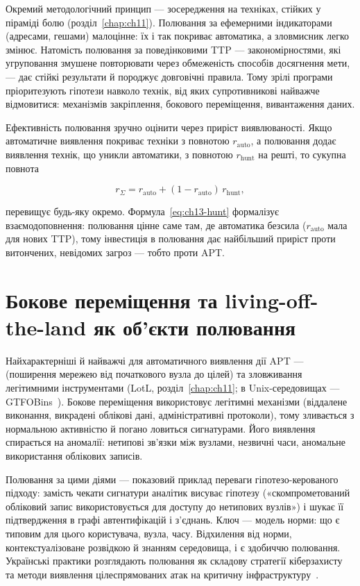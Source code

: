 Окремий методологічний принцип --- зосередження на техніках, стійких у піраміді болю (розділ~\ref{chap:ch11}). Полювання за ефемерними індикаторами (адресами, гешами) малоцінне: їх і так покриває автоматика, а зловмисник легко змінює. Натомість полювання за поведінковими TTP --- закономірностями, які угруповання змушене повторювати через обмеженість способів досягнення мети, --- дає стійкі результати й породжує довговічні правила. Тому зрілі програми пріоритезують гіпотези навколо технік, від яких супротивникові найважче відмовитися: механізмів закріплення, бокового переміщення, вивантаження даних.

Ефективність полювання зручно оцінити через приріст виявлюваності. Якщо автоматичне виявлення покриває техніки з повнотою $r_{\text{auto}}$, а полювання додає виявлення технік, що уникли автоматики, з повнотою $r_{\text{hunt}}$ на решті, то сукупна повнота

\begin{equation}
r_{\Sigma} = r_{\text{auto}} + (1 - r_{\text{auto}})\,r_{\text{hunt}},
\label{eq:ch13-hunt}
\end{equation}

перевищує будь-яку окремо. Формула~\eqref{eq:ch13-hunt} формалізує взаємодоповнення: полювання цінне саме там, де автоматика безсила ($r_{\text{auto}}$ мала для нових TTP), тому інвестиція в полювання дає найбільший приріст проти витончених, невідомих загроз --- тобто проти APT.

\section{Бокове переміщення та living-off-the-land як об'єкти полювання}\label{sec:ch13-lateral}

Найхарактерніші й найважчі для автоматичного виявлення дії APT ---  (поширення мережею від початкового вузла до цілей) та зловживання легітимними інструментами (LotL, розділ~\ref{chap:ch11}; в Unix-середовищах --- GTFOBins~\cite{ch13:gtfobins}). Бокове переміщення використовує легітимні механізми (віддалене виконання, викрадені облікові дані, адміністративні протоколи), тому зливається з нормальною активністю й погано ловиться сигнатурами. Його виявлення~\cite{ch13:lateral} спирається на аномалії: нетипові зв'язки між вузлами, незвичні часи, аномальне використання облікових записів.

Полювання за цими діями --- показовий приклад переваги гіпотезо-керованого підходу: замість чекати сигнатури аналітик висуває гіпотезу («скомпрометований обліковий запис використовується для доступу до нетипових вузлів») і шукає її підтвердження в графі автентифікацій і з'єднань. Ключ --- модель норми: що є типовим для цього користувача, вузла, часу. Відхилення від норми, контекстуалізоване розвідкою й знанням середовища, і є здобиччю полювання. Українські практики розглядають полювання як складову стратегії кіберзахисту~\cite{ch13:hunt-ua} та методи виявлення цілеспрямованих атак на критичну інфраструктуру~\cite{ch13:apt-crit-ua}.

